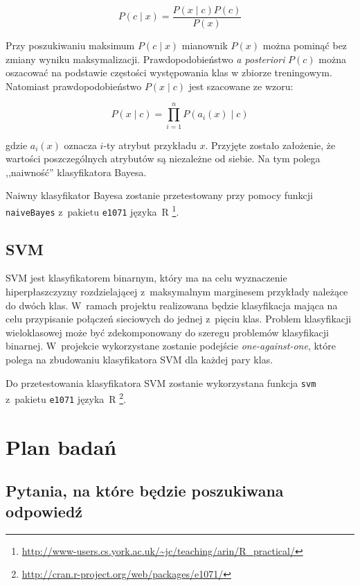 \documentclass[a4paper, 12pt]{article}
\begin{document}
$$ P(c \mid x) = \frac{P(x \mid c)P(c)}{P(x)} $$

Przy poszukiwaniu maksimum $P(c \mid x)$ mianownik $P(x)$ można pominąć bez zmiany wyniku 
maksymalizacji.
Prawdopodobieństwo \textit{a posteriori} $P(c)$ można oszacować na podstawie częstości 
występowania klas w zbiorze treningowym.
Natomiast prawdopodobieństwo $P(x \mid c)$ jest szacowane ze wzoru:

$$ P(x \mid c) = \prod_{i=1}^n P(a_i(x) \mid c)$$

gdzie $a_i(x)$ oznacza $i$-ty atrybut przykładu $x$.
Przyjęte zostało założenie, że wartości poszczególnych atrybutów są niezależne od siebie.
Na tym polega ,,naiwność'' klasyfikatora Bayesa.

Naiwny klasyfikator Bayesa zostanie przetestowany przy pomocy funkcji \texttt{naiveBayes} z~pakietu \texttt{e1071} języka~R
\footnote{\url{http://www-users.cs.york.ac.uk/~jc/teaching/arin/R_practical/}}.

\subsection{SVM}
SVM jest klasyfikatorem binarnym, który ma na celu wyznaczenie hiperpłaszczyzny rozdzielającej 
z~maksymalnym marginesem przykłady należące do dwóch klas. W~ramach projektu realizowana będzie 
klasyfikacja mająca na celu przypisanie połączeń sieciowych do jednej z~pięciu klas. 
Problem klasyfikacji wieloklasowej może być zdekomponowany do szeregu problemów klasyfikacji binarnej. 
W~projekcie wykorzystane zostanie podejście \textit{one-against-one}, 
które polega na zbudowaniu klasyfikatora SVM dla każdej pary klas. 

Do przetestowania klasyfikatora SVM zostanie wykorzystana funkcja \texttt{svm} z~pakietu 
\texttt{e1071} języka~R \footnote{\url{http://cran.r-project.org/web/packages/e1071/}}.

\section{Plan badań}

\subsection{Pytania, na które będzie poszukiwana odpowiedź}
\end{document}
